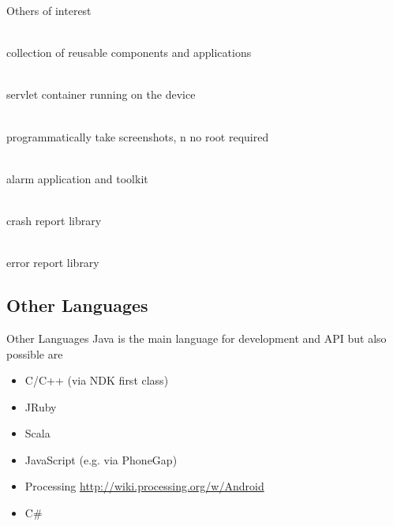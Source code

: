 \documentclass[aspectratio=169]{beamer}
\newcommand{\surl}[1] {{\tiny \url{#1}}}
\begin{document}
    \begin{frame}{Others of interest}
      \begin{description}
        \item<1->[OpenIntents \surl{http://code.google.com/p/openintents/}] \hfill \\ collection of reusable components and applications
        \item<2->[i-jetty \surl{http://code.google.com/p/i-jetty/}] \hfill \\ servlet container running on the device 
        \item<3->[Android Screenshot library \surl{http://code.google.com/p/android-screenshot-library/}] \hfill \\  programmatically take screenshots, n no root required 
        \item<4->[Android Alarm Database \surl{http://code.google.com/p/android-alarm-database/}] \hfill \\ alarm application and toolkit 
        \item<5->[Application Crash Report for Android ACRA \surl{http://code.google.com/p/acra/}] \hfill \\ crash report library
        \item<6->[Android Error Reporter \surl{https://github.com/tomquist/Android-Error-Reporter}] \hfill \\ error report library
      \end{description}
    \end{frame}

  \subsection{Other Languages}
    \begin{frame}{Other Languages}
      Java is the main language for development and API but also possible are 
      \begin{itemize}
      \item C/C++ (via NDK first class)
      \item JRuby
      \item Scala
      \item JavaScript (e.g. via PhoneGap)
      \item Processing \surl{http://wiki.processing.org/w/Android}
      \item C\#
      \end{itemize}
    \end{frame}
\end{document}
